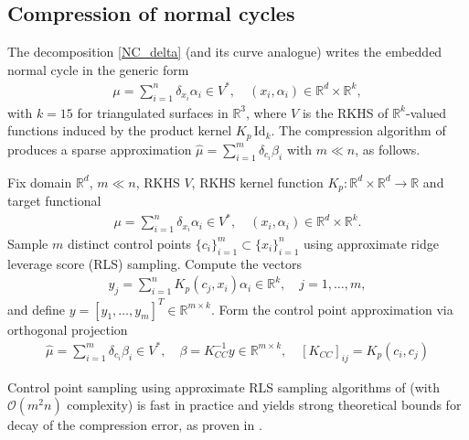 \documentclass[sn-mathphys-num]{sn-jnl}%
\theoremstyle{thmstyleone}%
\theoremstyle{thmstyletwo}%
\theoremstyle{thmstylethree}%
\numberwithin{remark}{section}
\numberwithin{definition}{section}
\numberwithin{equation}{section}
\numberwithin{theorem}{section}
\newcommand{\R}{\ensuremath{\mathbb{R}}}%
\begin{document}
\subsection{Compression of normal cycles}
The decomposition \cref{NC_delta} (and its curve analogue) writes the embedded normal cycle in the generic form
\begin{align*}
    \mu = \sum_{i=1}^{n}{\delta_{x_{i}}\alpha_{i}} \in V^{*},\quad (x_{i},\alpha_{i}) \in \R^{d}\times \R^{k},
\end{align*}
with $k=15$ for triangulated surfaces in $\R^{3}$, where $V$ is the RKHS of $\R^{k}$-valued functions induced by the product kernel $K_{p}\,\mathrm{Id}_{k}$. The compression algorithm of \cite{SparseNystromCurrVar} produces a sparse approximation $\hat{\mu}=\sum_{i=1}^{m}{\delta_{c_{i}}\beta_{i}}$ with $m\ll n$, as follows.
\begin{algorithm}[H]
\caption{Discrete functional compression with RLS sampling}
\begin{algorithmic}[1]
\State Fix domain $\R^{d}$, $m \ll n$, RKHS $V$, RKHS kernel function $K_{p}:\R^{d}\times \R^{d} \longrightarrow \R$ and target functional
\begin{align*}
    \mu = \sum_{i=1}^{n}{\delta_{x_{i}}\alpha_{i}} \in V^{*},\quad (x_{i},\alpha_{i}) \in \R^{d}\times \R^{k}.
\end{align*}
\State Sample $m$ distinct control points $\{c_{i}\}_{i=1}^{m} \subset \{x_{i}\}_{i=1}^{n}$ using approximate ridge leverage score (RLS) \cite{Musco,DAC} sampling.
\State Compute the vectors
\begin{align*}
y_{j} = \sum_{i=1}^{n}{K_{p}(c_{j},x_{i})\alpha_{i}} \in \R^{k},\quad j=1,\dots,m,
\end{align*}
and define $y=[y_{1},\dots,y_{m}]^{T} \in \R^{m\times k}$.
\State Form the control point approximation via orthogonal projection
\begin{align*}
    \hat{\mu} = \sum_{i=1}^{m}{\delta_{c_{i}}\beta_{i}} \in V^{*},\quad \beta = K_{CC}^{-1}y \in \R^{m\times k},\quad [K_{CC}]_{ij}=K_{p}(c_{i},c_{j})
\end{align*}
\end{algorithmic}\label{algorithm1}
\end{algorithm}
Control point sampling using approximate RLS sampling algorithms of \cite{Musco,DAC} (with $\mathcal{O}(m^{2}n)$ complexity) is fast in practice and yields strong theoretical bounds for decay of the compression error, as proven in \cite{SparseNystromCurrVar}. 
\end{document}
